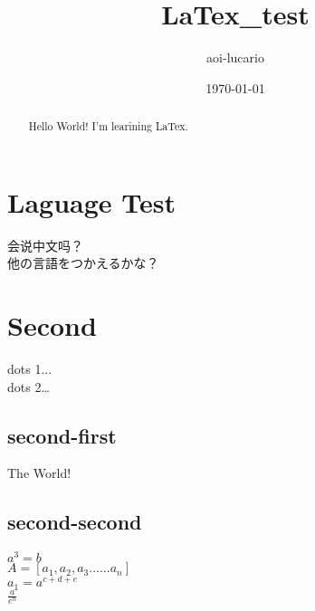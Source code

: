 \documentclass[a4paper,9pt]{article}
\author{aoi-lucario}
\title{LaTex_test}
\date{\today}
\begin{document}
  \maketitle

\begin{abstract}
Hello World! I'm learining LaTex.
\end{abstract}

\section{Laguage Test}
会说中文吗？\\
他の言語をつかえるかな？

\section{Second}
dots 1...\\
dots 2\ldots

\subsection{second-first}
The World!

\subsection{second-second}
$a^3=b$\\
$A=[a_1,a_2,a_3......a_n]$\\
$a_1=a^{c+d+e}$\\
$\frac{a}{e^n}$
\end{document}
